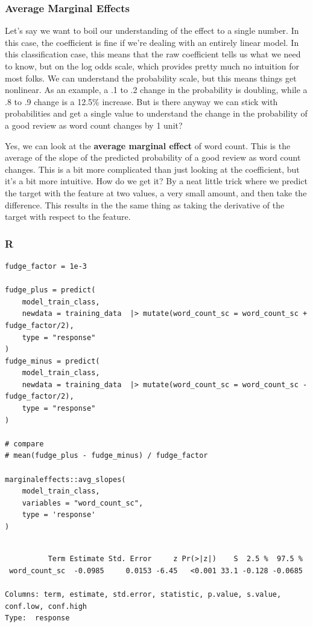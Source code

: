 \documentclass[
  letterpaper,
]{krantz}
\begin{document}
\subsubsection{Average Marginal Effects}\label{average-marginal-effects}

Let's say we want to boil our understanding of the effect to a single
number. In this case, the coefficient is fine if we're dealing with an
entirely linear model. In this classification case, this means that the
raw coefficient tells us what we need to know, but on the log odds
scale, which provides pretty much no intuition for most folks. We can
understand the probability scale, but this means things get nonlinear.
As an example, a .1 to .2 change in the probability is doubling, while a
.8 to .9 change is a 12.5\% increase. But is there anyway we can stick
with probabilities and get a single value to understand the change in
the probability of a good review as word count changes by 1 unit?

Yes, we can look at the \textbf{average marginal effect} of word count.
This is the average of the slope of the predicted probability of a good
review as word count changes. This is a bit more complicated than just
looking at the coefficient, but it's a bit more intuitive. How do we get
it? By a neat little trick where we predict the target with the feature
at two values, a very small amount, and then take the difference. This
results in the the same thing as taking the derivative of the target
with respect to the feature.

\subsubsection{R}

\begin{verbatim}
fudge_factor = 1e-3

fudge_plus = predict(
    model_train_class, 
    newdata = training_data  |> mutate(word_count_sc = word_count_sc + fudge_factor/2),
    type = "response"
)
fudge_minus = predict(
    model_train_class, 
    newdata = training_data  |> mutate(word_count_sc = word_count_sc - fudge_factor/2),
    type = "response"
)

# compare
# mean(fudge_plus - fudge_minus) / fudge_factor

marginaleffects::avg_slopes(
    model_train_class, 
    variables = "word_count_sc", 
    type = 'response'
)
\end{verbatim}

\begin{verbatim}

          Term Estimate Std. Error     z Pr(>|z|)    S  2.5 %  97.5 %
 word_count_sc  -0.0985     0.0153 -6.45   <0.001 33.1 -0.128 -0.0685

Columns: term, estimate, std.error, statistic, p.value, s.value, conf.low, conf.high 
Type:  response 
\end{verbatim}
\end{document}
